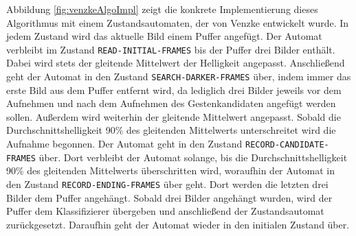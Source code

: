 \newline
\newline
Abbildung \ref{fig:venzkeAlgoImpl} zeigt die konkrete Implementierung dieses Algorithmus mit einem Zustandsautomaten, der von Venzke entwickelt wurde. In jedem Zustand wird das aktuelle Bild einem Puffer angefügt.
Der Automat verbleibt im Zustand \texttt{READ-INITIAL-FRAMES} bis der Puffer drei Bilder enthält. Dabei wird stets der gleitende Mittelwert der Helligkeit angepasst. Anschließend geht der Automat in den Zustand
\texttt{SEARCH-DARKER-FRAMES} über, indem immer das erste Bild aus dem Puffer entfernt wird, da lediglich drei Bilder jeweils vor dem Aufnehmen und nach dem Aufnehmen des
Gestenkandidaten angefügt werden sollen. Außerdem wird weiterhin der gleitende Mittelwert angepasst. Sobald die Durchschnittshelligkeit 90\% des gleitenden Mittelwerts unterschreitet wird die Aufnahme begonnen.
Der Automat geht in den Zustand \texttt{RECORD-CANDIDATE-FRAMES} über. Dort verbleibt der Automat solange, bis die Durchschnittshelligkeit 90\% des gleitenden Mittelwerts überschritten wird, woraufhin der Automat
in den Zustand \texttt{RECORD-ENDING-FRAMES} über geht. Dort werden die letzten drei Bilder dem Puffer angehängt. Sobald drei Bilder angehängt wurden, wird der Puffer dem Klassifizierer übergeben und anschließend
der Zustandsautomat zurückgesetzt. Daraufhin geht der Automat wieder in den initialen Zustand über.